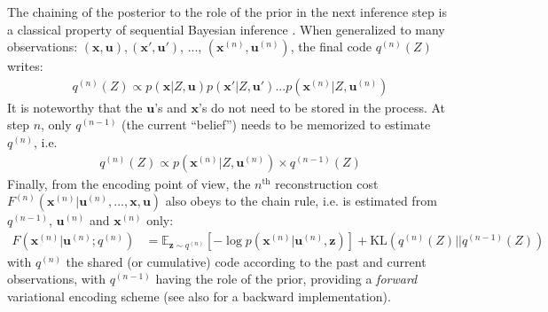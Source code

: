\documentclass{article}
\begin{document}
The chaining of the posterior to the role of the prior in the next inference step is a classical property of sequential Bayesian inference \citep{wald1945sequential}.
When generalized to many observations: $(\boldsymbol{x},\boldsymbol{u}), (\boldsymbol{x}',\boldsymbol{u}')$, ..., $(\boldsymbol{x}^{(n)},\boldsymbol{u}^{(n)})$, the final code $q^{(n)}(Z)$ writes:
\begin{align}
q^{(n)}(Z) \propto p(\boldsymbol{x}|Z,\boldsymbol{u}) p(\boldsymbol{x}'|Z,\boldsymbol{u}') ... p(\boldsymbol{x}^{(n)}|Z,\boldsymbol{u}^{(n)}) \label{eq:accum}
\end{align}
It is noteworthy that the $\boldsymbol{u}$'s and $\boldsymbol{x}$'s do not need to be stored in the process. At step $n$, only $q^{(n-1)}$ (the current ``belief'') needs to be memorized to estimate $q^{(n)}$, i.e. 
\begin{align} 
q^{(n)}(Z) \propto p(\boldsymbol{x}^{(n)}|Z,\boldsymbol{u}^{(n)}) \times q^{(n-1)}(Z) \label{eq:accum-post}
\end{align}
Finally, from the encoding point of view, the $n^\text{th}$ reconstruction cost $F^{(n)}(\boldsymbol{x}^{(n)}|\boldsymbol{u}^{(n)}, ..., \boldsymbol{x}, \boldsymbol{u})$ also obeys to the chain rule, i.e. is estimated from $q^{(n-1)}$, $\boldsymbol{u}^{(n)}$ and $\boldsymbol{x}^{(n)}$ only:
\begin{align}
F(\boldsymbol{x}^{(n)}|\boldsymbol{u}^{(n)}; q^{(n)}) 
&= \mathbb{E}_{\boldsymbol{z} \sim q^{(n)}} \left[-\log p(\boldsymbol{x}^{(n)}| \boldsymbol{u}^{(n)}, \boldsymbol{z})\right] + \text{KL}(q^{(n)}(Z)||q^{(n-1)}(Z))
\label{eq:FEP-uxun}
\end{align}
with $q^{(n)}$ the shared (or cumulative) code according to the past and current observations, with $q^{(n-1)}$ having the role of the prior, providing a \emph{forward} variational encoding scheme (see also \cite{fraccaro2016sequential} for a backward implementation). 
\end{document}
